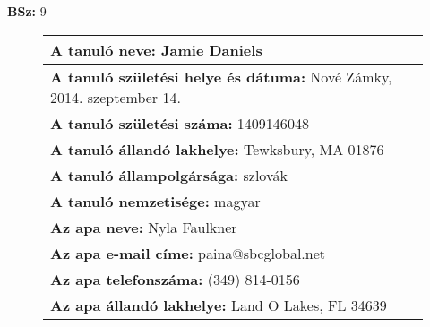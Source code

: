 \documentclass[10pt,a4paper]{article}
\begin{document}
    \vfill
    \textbf{BSz: }9
\newpage
    \begin{figure}[!ht]
    \begin{tabular}{|m{\textwidth}|}
    \hline \vspace{3pt}
    \textbf{A tanuló neve:} \hspace{0.5cm} Jamie Daniels \vspace{3pt} \\
\hline\vspace{3pt}
\textbf{A tanuló születési helye és dátuma:} \hspace{0.5cm} Nové Zámky, 2014. szeptember 14. \vspace{3pt} \\
\hline\vspace{3pt}
\textbf{A tanuló születési száma:} \hspace{0.5cm} 1409146048 \vspace{3pt} \\
\hline\vspace{3pt}
\textbf{A tanuló állandó lakhelye:} \hspace{0.5cm} Tewksbury, MA 01876 \vspace{3pt} \\
\hline\vspace{3pt}
\textbf{A tanuló állampolgársága:} \hspace{0.5cm} szlovák \vspace{3pt} \\
\hline\vspace{3pt}
\textbf{A tanuló nemzetisége:} \hspace{0.5cm} magyar \vspace{3pt} \\
\hline\vspace{3pt}
\textbf{Az apa neve:} \hspace{0.5cm} Nyla Faulkner \vspace{3pt} \\
\hline\vspace{3pt}
\textbf{Az apa e-mail címe:} \hspace{0.5cm} paina@sbcglobal.net \vspace{3pt} \\
\hline\vspace{3pt}
\textbf{Az apa telefonszáma:} \hspace{0.5cm} (349) 814-0156 \vspace{3pt} \\
\hline\vspace{3pt}
\textbf{Az apa állandó lakhelye:} \hspace{0.5cm} Land O Lakes, FL 34639 \vspace{3pt} \\

\end{tabular}
\end{figure}
\end{document}
